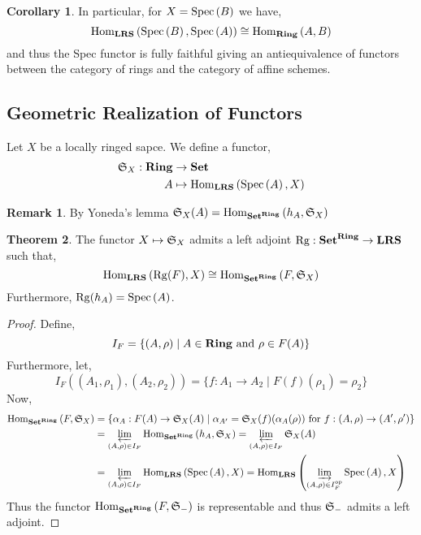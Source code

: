 \documentclass[12pt]{extarticle}
\newcommand{\Set}{\mathbf{Set}}
\theoremstyle{definition}
\newtheorem{theorem}{Theorem}[section]
\newtheorem{corollary}[theorem]{Corollary}
\newtheorem{remark}{Remark}
\newenvironment{definition}[1][Definition:]{\begin{trivlist}
\item[\hskip \labelsep {\bfseries #1}]}{\end{trivlist}}
\begin{document}
\begin{corollary}
In particular, for $X = \mathrm{Spec}\left( B \right)$ we have,
\[ \mathrm{Hom}_{\mathbf{LRS}}\left( \mathrm{Spec}\left( B \right), \mathrm{Spec}\left( A \right) \right) \cong \mathrm{Hom}_{\mathbf{Ring}}\left( A, B \right) \]
and thus the Spec functor is fully faithful giving an antiequivalence of functors between the category of rings and the category of affine schemes.
\end{corollary}

\subsection{Geometric Realization of Functors}

\begin{definition}
Let $X$ be a locally ringed sapce. We define a functor,
\begin{align*}
\mathfrak{S}_X : \mathbf{Ring} & \to \mathbf{Set}
\\
A & \mapsto \mathrm{Hom}_{\mathbf{LRS}}\left( \mathrm{Spec}\left( A \right), X \right)
\end{align*}
\end{definition}

\begin{remark}
By Yoneda's lemma $\Sf_X(A) = \Homover{\Set^{\Ring}}{h_A}{\Sf_X}$ 
\end{remark}

\begin{theorem}
The functor $X \mapsto \mathfrak{S}_X$ admits a left adjoint $\Rg : \Set^{\Ring} \to \LRS$ such that,
\[ \Homover{\LRS}{\Rg(F)}{X} \cong \Homover{\Set^{\Ring}}{F}{\Sf_X} \]
Furthermore, $\mathrm{Rg}(h_A) = \mathrm{Spec}\left( A \right)$.
\end{theorem}

\begin{proof}
Define,
\[ I_F = \{ (A, \rho) \mid A \in \mathbf{Ring} \text{ and } \rho \in F(A) \} \]
Furthermore, let,
\[ I_F((A_1, \rho_1), (A_2, \rho_2)) = \{ f : A_1 \to A_2 \mid F(f)(\rho_1) = \rho_2 \} \]
Now,
\begin{align*}
\Homover{\Set^{\Ring}}{F}{\Sf_X} & = \{ \alpha_A : F(A) \to \Sf_X(A) \mid \alpha_{A'} = \Sf_X(f)(\alpha_A(\rho)) \text{ for } f : (A, \rho) \to (A', \rho') \} 
\\
& = \varprojlim_{(A, \rho) \in I_F}  \Homover{\Set^\Ring}{h_A}{\Sf_X} = \varprojlim_{(A, \rho) \in I_F} \Sf_X(A)
\\
& =  \varprojlim_{(A, \rho) \in I_F} \Homover{\LRS}{\Spec{A}}{X}  = \Homover{\LRS}{\varinjlim_{(A, \rho) \in I_F^\op} \Spec{A}}{X} 
\end{align*}
Thus the functor $\Homover{\Set^\Ring}{F}{\Sf_{-}}$ is representable and thus $\mathfrak{S}_{-}$ admits a left adjoint. 
\end{proof}
\end{document}
